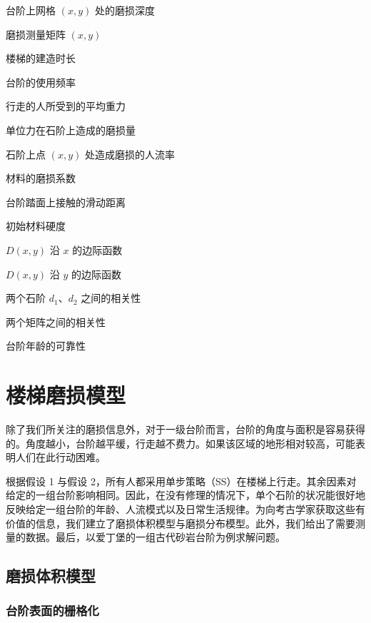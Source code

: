 \documentclass[11pt,a4paper]{ctexart}
\begin{document}
\begin{description}[leftmargin=3.6cm,labelwidth=3.3cm,labelsep=0.3cm,itemsep=1.5pt,topsep=2pt,parsep=0pt]
\item[\(d(x,y)\)] 台阶上网格 \((x,y)\) 处的磨损深度
\item[\(D^{measure}\)] 磨损测量矩阵 \((x,y)\)
\item[\(T\)] 楼梯的建造时长
\item[\(N_d\)] 台阶的使用频率
\item[\(G\)] 行走的人所受到的平均重力
\item[\(k_m\)] 单位力在石阶上造成的磨损量
\item[\(D(x,y)\)] 石阶上点 \((x,y)\) 处造成磨损的人流率
\item[\(k_m\)] 材料的磨损系数
\item[\(d\)] 台阶踏面上接触的滑动距离
\item[\(H_0\)] 初始材料硬度
\item[\(D_X\)] \(D(x,y)\) 沿 \(x\) 的边际函数
\item[\(D_Y\)] \(D(x,y)\) 沿 \(y\) 的边际函数
\item[\(RS(d_1,d_2)\)] 两个石阶 \(d_1\)、\(d_2\) 之间的相关性
\item[\(PA\)] 两个矩阵之间的相关性
\item[\(CI\)] 台阶年龄的可靠性
\end{description}

\section{楼梯磨损模型}

除了我们所关注的磨损信息外，对于一级台阶而言，台阶的角度与面积是容易获得的。角度越小，台阶越平缓，行走越不费力。如果该区域的地形相对较高，可能表明人们在此行动困难。

根据假设 1 与假设 2，所有人都采用单步策略（SS）在楼梯上行走。其余因素对给定的一组台阶影响相同。因此，在没有修理的情况下，单个石阶的状况能很好地反映给定一组台阶的年龄、人流模式以及日常生活规律。为向考古学家获取这些有价值的信息，我们建立了磨损体积模型与磨损分布模型。此外，我们给出了需要测量的数据。最后，以爱丁堡的一组古代砂岩台阶为例求解问题。

\subsection{磨损体积模型}

\subsubsection{台阶表面的栅格化}
\end{document}
